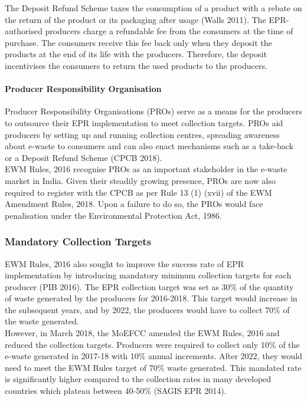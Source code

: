 \documentclass[a4paper, 12pt]{article}
\begin{document}
                    The Deposit Refund Scheme taxes the consumption of a product with a rebate on the return of the product or its packaging after usage (Walls 2011). The EPR-authorised producers charge a refundable fee from the consumers at the time of purchase. The consumers receive this fee back only when they deposit the products at the end of its life with the producers. Therefore, the deposit incentivises the consumers to return the used products to the producers. \\
                    
                    \paragraph{Producer Responsibility Organisation}
                    
                    Producer Responsibility Organisations (PROs) serve as a means for the producers to outsource their EPR implementation to meet collection targets. PROs aid producers by setting up and running collection centres, spreading awareness about e-waste to consumers and can also enact mechanisms such as a take-back or a Deposit Refund Scheme (CPCB 2018).\\
                    EWM Rules, 2016 recognise PROs as an important stakeholder in the e-waste market in India. Given their steadily growing presence, PROs are now also required to register with the CPCB as per Rule 13 (1) (xvii) of the EWM Amendment Rules, 2018. Upon a failure to do so, the PROs would face penalisation under the Environmental Protection Act, 1986.\\
                    
                    \subsubsection{Mandatory Collection Targets}
                    
                    EWM Rules, 2016 also sought to improve the success rate of EPR implementation by introducing mandatory minimum collection targets for each producer (PIB 2016). The EPR collection target was set as 30\% of the quantity of waste generated by the producers for 2016-2018. This target would increase in the subsequent years, and by 2022, the producers would have to collect 70\% of the waste generated.\\
                    However, in March 2018, the MoEFCC amended the EWM Rules, 2016 and reduced the collection targets. Producers were required to collect only 10\% of the e-waste generated in 2017-18 with 10\% annual increments. After 2022, they would need to meet the EWM Rules target of 70\% waste generated. This mandated rate is significantly higher compared to the collection rates in many developed countries which plateau between 40-50\% (SAGIS EPR 2014).  \\
                    
\end{document}
